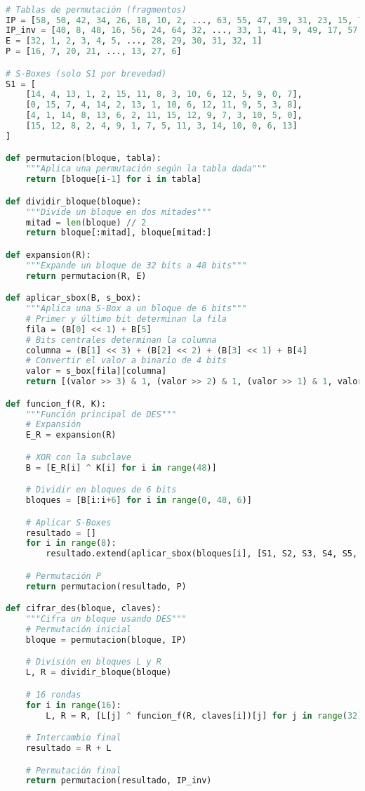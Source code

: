 \begin{lstlisting}[language=Python, caption={Fragmento de implementación de DES en Python}, label=lst:des-python]

# Tablas de permutación (fragmentos)
IP = [58, 50, 42, 34, 26, 18, 10, 2, ..., 63, 55, 47, 39, 31, 23, 15, 7]
IP_inv = [40, 8, 48, 16, 56, 24, 64, 32, ..., 33, 1, 41, 9, 49, 17, 57, 25]
E = [32, 1, 2, 3, 4, 5, ..., 28, 29, 30, 31, 32, 1]
P = [16, 7, 20, 21, ..., 13, 27, 6]

# S-Boxes (solo S1 por brevedad)
S1 = [
    [14, 4, 13, 1, 2, 15, 11, 8, 3, 10, 6, 12, 5, 9, 0, 7],
    [0, 15, 7, 4, 14, 2, 13, 1, 10, 6, 12, 11, 9, 5, 3, 8],
    [4, 1, 14, 8, 13, 6, 2, 11, 15, 12, 9, 7, 3, 10, 5, 0],
    [15, 12, 8, 2, 4, 9, 1, 7, 5, 11, 3, 14, 10, 0, 6, 13]
]

def permutacion(bloque, tabla):
    """Aplica una permutación según la tabla dada"""
    return [bloque[i-1] for i in tabla]

def dividir_bloque(bloque):
    """Divide un bloque en dos mitades"""
    mitad = len(bloque) // 2
    return bloque[:mitad], bloque[mitad:]

def expansion(R):
    """Expande un bloque de 32 bits a 48 bits"""
    return permutacion(R, E)

def aplicar_sbox(B, s_box):
    """Aplica una S-Box a un bloque de 6 bits"""
    # Primer y último bit determinan la fila
    fila = (B[0] << 1) + B[5]
    # Bits centrales determinan la columna
    columna = (B[1] << 3) + (B[2] << 2) + (B[3] << 1) + B[4]
    # Convertir el valor a binario de 4 bits
    valor = s_box[fila][columna]
    return [(valor >> 3) & 1, (valor >> 2) & 1, (valor >> 1) & 1, valor & 1]

def funcion_f(R, K):
    """Función principal de DES"""
    # Expansión
    E_R = expansion(R)

    # XOR con la subclave
    B = [E_R[i] ^ K[i] for i in range(48)]

    # Dividir en bloques de 6 bits
    bloques = [B[i:i+6] for i in range(0, 48, 6)]

    # Aplicar S-Boxes
    resultado = []
    for i in range(8):
        resultado.extend(aplicar_sbox(bloques[i], [S1, S2, S3, S4, S5, S6, S7, S8][i]))

    # Permutación P
    return permutacion(resultado, P)

def cifrar_des(bloque, claves):
    """Cifra un bloque usando DES"""
    # Permutación inicial
    bloque = permutacion(bloque, IP)

    # División en bloques L y R
    L, R = dividir_bloque(bloque)

    # 16 rondas
    for i in range(16):
        L, R = R, [L[j] ^ funcion_f(R, claves[i])[j] for j in range(32)]

    # Intercambio final
    resultado = R + L

    # Permutación final
    return permutacion(resultado, IP_inv)
\end{lstlisting}
